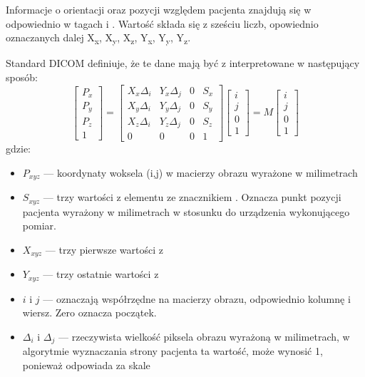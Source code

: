Informacje o orientacji oraz pozycji względem pacjenta znajdują się w odpowiednio w tagach  i .
Wartość  składa się z sześciu liczb, opowiednio oznaczanych dalej X\textsubscript{x}, X\textsubscript{y}, X\textsubscript{z}, Y\textsubscript{x}, Y\textsubscript{y}, Y\textsubscript{z}.

Standard DICOM definiuje, że te dane mają być z interpretowane w następujący sposób:
\[
    \begin{bmatrix}
        P_x \\ P_y \\ P_z \\ 1
    \end{bmatrix}
    =
    \begin{bmatrix}
        X_x\Delta_i & Y_x\Delta_j & 0 & S_x \\
        X_y\Delta_i & Y_y\Delta_j & 0 & S_y \\
        X_z\Delta_i & Y_z\Delta_j & 0 & S_z \\
        0           & 0           & 0 & 1
    \end{bmatrix}
    \begin{bmatrix}
        i \\ j \\ 0 \\ 1
    \end{bmatrix}
    =
    M
    \begin{bmatrix}
        i \\ j \\ 0 \\ 1
    \end{bmatrix}
\]
gdzie:
\begin{itemize}
    \item $P_{xyz}$ --- koordynaty woksela (i,j) w macierzy obrazu wyrażone w milimetrach
    \item $S_{xyz}$ --- trzy wartości z elementu ze znacznikiem . Oznacza punkt pozycji pacjenta wyrażony w milimetrach w stosunku do urządzenia wykonującego pomiar.
    \item $X_{xyz}$ --- trzy pierwsze wartości z 
    \item $Y_{xyz}$ --- trzy ostatnie wartości z 
    \item $i$ i $j$ --- oznaczają współrzędne na macierzy obrazu, odpowiednio kolumnę i wiersz. Zero oznacza początek.
    \item $\Delta_i$ i $\Delta_j$ --- rzeczywista wielkość piksela obrazu wyrażoną w milimetrach, w algorytmie wyznaczania strony pacjenta ta wartość, może wynosić 1, ponieważ odpowiada za skale
\end{itemize}

